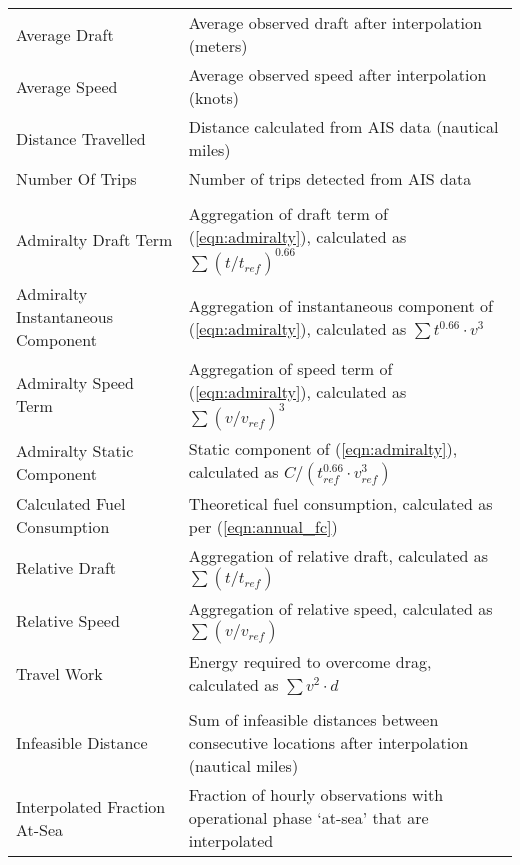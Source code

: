 \begin{tabular}[t]{>{\raggedright\arraybackslash}p{16em}>{\raggedright\arraybackslash}p{30em}}
\hspace{1em}Average Draft & Average observed draft after interpolation (meters)\\
\hspace{1em}Average Speed & Average observed speed after interpolation (knots)\\
\hspace{1em}Distance Travelled & Distance calculated from AIS data (nautical miles)\\
\hspace{1em}Number Of Trips & Number of trips detected from AIS data\\
\addlinespace[0.3em]
\multicolumn{2}{l}{\textbf{Calculated}}\\
\hspace{1em}Admiralty Draft Term & Aggregation of draft term of (\ref{eqn:admiralty}), calculated as $\sum (t/t_{\textit{ref}})^{0.66}$\\
\hspace{1em}Admiralty Instantaneous Component & Aggregation of instantaneous component of (\ref{eqn:admiralty}), calculated as $\sum t^{0.66} \cdot v^3$\\
\hspace{1em}Admiralty Speed Term & Aggregation of speed term of (\ref{eqn:admiralty}), calculated as $\sum (v/v_{\textit{ref}})^{3}$\\
\hspace{1em}Admiralty Static Component & Static component of (\ref{eqn:admiralty}), calculated as $C / (t_{\textit{ref}}^{0.66} \cdot v_{\textit{ref}}^3)$\\
\hspace{1em}Calculated Fuel Consumption & Theoretical fuel consumption, calculated as per (\ref{eqn:annual_fc})\\
\hspace{1em}Relative Draft & Aggregation of relative draft, calculated as $\sum (t/t_{\textit{ref}})$\\
\hspace{1em}Relative Speed & Aggregation of relative speed, calculated as $\sum (v/v_{\textit{ref}})$\\
\hspace{1em}Travel Work & Energy required to overcome drag, calculated as $\sum v^2 \cdot d$\\
\addlinespace[0.3em]
\multicolumn{2}{l}{\textbf{Data Quality}}\\
\hspace{1em}Infeasible Distance & Sum of infeasible distances between consecutive locations after interpolation (nautical miles)\\
\hspace{1em}Interpolated Fraction At-Sea & Fraction of hourly observations with operational phase ‘at-sea’ that are interpolated\\
\bottomrule
\end{tabular}
